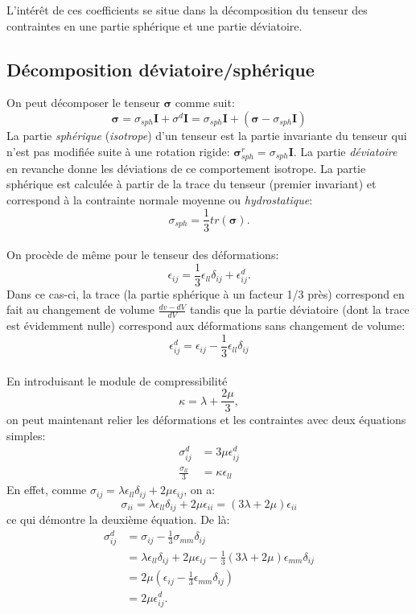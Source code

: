 L'intérêt de ces coefficients se situe dans la décomposition du tenseur des contraintes en une partie sphérique et une partie déviatoire.

\subsection{Décomposition déviatoire/sphérique}
On peut décomposer le tenseur $\boldsymbol{\sigma}$ comme suit: 
$$\boldsymbol{\sigma}=\sigma_{sph}\textbf{I}+\sigma^d\textbf{I}=\sigma_{sph}\textbf{I}+(\boldsymbol{\sigma}-\sigma_{sph}\textbf{I})$$
La partie \emph{sphérique} (\emph{isotrope}) d'un tenseur est la partie invariante du tenseur qui n'est pas modifiée suite à une rotation rigide: $\boldsymbol{\sigma}_{sph}^r=\sigma_{sph}\textbf{I}$. La partie \emph{déviatoire} en revanche donne les déviations de ce comportement isotrope. 
La partie sphérique est calculée à partir de la trace du tenseur (premier invariant) et correspond à la contrainte normale moyenne ou \emph{hydrostatique}:
$$\sigma_{sph}=\frac{1}{3}tr(\boldsymbol{\sigma}).$$
\paragraph{}
On procède de même pour le tenseur des déformations:
$$\epsilon_{ij}=\frac{1}{3}\epsilon_{ll}\delta_{ij}+\epsilon_{ij}^d.$$ Dans ce cas-ci, la trace (la partie sphérique à un facteur 1/3 près) correspond en fait au changement de volume $\frac{dv-dV}{dV}$ tandis que la partie déviatoire (dont la trace est évidemment nulle) correspond aux déformations sans changement de volume:
$$\epsilon_{ij}^d=\epsilon_{ij}-\frac{1}{3}\epsilon_{ll}\delta_{ij}$$
\paragraph{}
En introduisant le module de compressibilité $$\kappa=\lambda+\frac{2\mu}{3},$$ on peut maintenant relier les déformations et les contraintes avec deux équations simples:
\begin{align}
\label{defo-cont}
\sigma_{ij}^d&=3\mu\epsilon_{ij}^d\\
\frac{\sigma_{ll}}{3}&=\kappa\epsilon_{ll}
\end{align}
En effet, comme $\sigma_{ij}=\lambda\epsilon_{ll}\delta_{ij}+2\mu\epsilon_{ij}$, on a:
$$\sigma_{ii}=\lambda\epsilon_{ll}\delta_{ij}+2\mu\epsilon_{ii}=(3\lambda+2\mu)\epsilon_{ii}$$ ce qui démontre la deuxième équation. De là:
\begin{align*}
\sigma_{ij}^d&=\sigma_{ij}-\frac{1}{3}\sigma_{mm}\delta_{ij}\\
 &=\lambda\epsilon_{ll}\delta_{ij}+2\mu\epsilon_{ij}-\frac{1}{3}(3\lambda+2\mu)\epsilon_{mm}\delta_{ij}\\
 &=2\mu(\epsilon_{ij}-\frac{1}{3}\epsilon_{mm}\delta_{ij})\\
 &=2\mu\epsilon_{ij}^d.\\
\end{align*}


